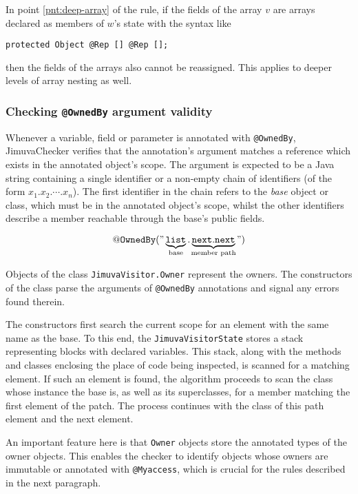 \documentclass{pracamgr}
\theoremstyle{break}
\theoremstyle{break}
\theoremstyle{break}
\begin{document}
In point \ref{pnt:deep-array} of the rule, if the fields of the
array $v$ are arrays declared as members of $w$'s state with the
syntax like
\begin{center}
  \texttt{protected Object @Rep [] @Rep [];}
\end{center}
then the fields of the arrays also cannot be reassigned. This applies
to deeper levels of array nesting as well. 

\subsubsection{Checking \texttt{@OwnedBy} argument validity} 

Whenever a variable, field or parameter is annotated with
\texttt{@OwnedBy}, JimuvaChecker verifies that the annotation's
argument matches a reference which exists in the annotated object's
scope. The argument is expected to be a Java string containing a
single identifier or a non-empty chain of identifiers (of the form
$x_1.x_2.\cdots.x_n$). The first identifier in the chain refers to the
\emph{base} object or class, which must be in the annotated object's
scope, whilst the other identifiers describe a member reachable
through the base's public fields.

$$ \mathtt{@OwnedBy("}\underbrace{\mathtt{list}}_{\mathclap{\textrm{base}}} 
\mathtt{.}
\underbrace{\mathtt{next.next}}_{\mathclap{\textrm{member path}}}\mathtt{")} $$

Objects of the class
\texttt{JimuvaVisitor.Owner} represent the owners. The constructors of
the class parse the arguments of \texttt{@OwnedBy} annotations and
signal any errors found therein.

The constructors first search the current scope for an element with
the same name as the base. To this end, the
\texttt{JimuvaVisitorState} stores a stack representing blocks with
declared variables. This stack, along with the methods and classes
enclosing the place of code being inspected, is scanned for a
matching element. If such an element is found, the algorithm proceeds
to scan the class whose instance the base is, as well as its
superclasses, for a member matching the first element of the
patch. The process continues with the class of this path element and
the next element.

An important feature here is that \texttt{Owner} objects store the
annotated types of the owner objects. This enables the checker to
identify objects whose owners are immutable or annotated with
\texttt{@Myaccess}, which is crucial for the rules described in the
next paragraph.
\end{document}
